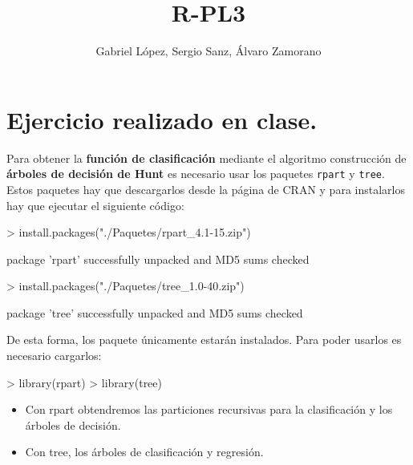 \documentclass [a4paper] {article}
\title{R-PL3}
\author{Gabriel López, Sergio Sanz, Álvaro Zamorano}
\begin{document}


\maketitle

\graphicspath{ {./tmp/} }

\section{Ejercicio realizado en clase.}
Para obtener la \textbf{función de clasificación} mediante el algoritmo construcción
de \textbf{árboles de decisión de Hunt} es necesario usar los paquetes \texttt{rpart} y
\texttt{tree}. Estos paquetes hay que descargarlos desde la página de CRAN y para instalarlos
hay que ejecutar el siguiente código:

\begin{Schunk}
\begin{Sinput}
> install.packages("./Paquetes/rpart_4.1-15.zip")
\end{Sinput}
\begin{Soutput}
package 'rpart' successfully unpacked and MD5 sums checked
\end{Soutput}
\begin{Sinput}
> install.packages("./Paquetes/tree_1.0-40.zip")
\end{Sinput}
\begin{Soutput}
package 'tree' successfully unpacked and MD5 sums checked
\end{Soutput}
\end{Schunk}

\bigskip
De esta forma, los paquete únicamente estarán instalados. Para poder usarlos es necesario cargarlos:
\begin{Schunk}
\begin{Sinput}
> library(rpart)
> library(tree)
\end{Sinput}
\end{Schunk}

\begin{itemize}
\item Con rpart obtendremos las particiones recursivas para la clasificación y los árboles de decisión.
\item Con tree, los árboles de clasificación y regresión.
\end{itemize}

\end{document}
